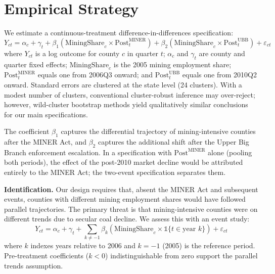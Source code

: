 \documentclass[12pt]{article}
\begin{document}



\section{Empirical Strategy}
\label{sec:design}

We estimate a continuous-treatment difference-in-differences specification:
\begin{equation}
\label{eq:main}
Y_{ct} = \alpha_c + \gamma_t + \beta_1 \left( \text{MiningShare}_c \times \text{Post}^{\text{MINER}}_t \right) + \beta_2 \left( \text{MiningShare}_c \times \text{Post}^{\text{UBB}}_t \right) + \varepsilon_{ct}
\end{equation}
where $Y_{ct}$ is a log outcome for county $c$ in quarter $t$; $\alpha_c$ and $\gamma_t$ are county and quarter fixed effects; $\text{MiningShare}_c$ is the 2005 mining employment share; $\text{Post}^{\text{MINER}}_t$ equals one from 2006Q3 onward; and $\text{Post}^{\text{UBB}}_t$ equals one from 2010Q2 onward. Standard errors are clustered at the state level (24 clusters). With a modest number of clusters, conventional cluster-robust inference may over-reject; however, wild-cluster bootstrap methods \citep{roth2023more} yield qualitatively similar conclusions for our main specifications.

The coefficient $\beta_1$ captures the differential trajectory of mining-intensive counties after the MINER Act, and $\beta_2$ captures the additional shift after the Upper Big Branch enforcement escalation. In a specification with $\text{Post}^{\text{MINER}}$ alone (pooling both periods), the effect of the post-2010 market decline would be attributed entirely to the MINER Act; the two-event specification separates them.

\textbf{Identification.} Our design requires that, absent the MINER Act and subsequent events, counties with different mining employment shares would have followed parallel trajectories. The primary threat is that mining-intensive counties were on different trends due to secular coal decline. We assess this with an event study:
\begin{equation}
\label{eq:es}
Y_{ct} = \alpha_c + \gamma_t + \sum_{k \neq -1} \beta_k \left( \text{MiningShare}_c \times \mathbb{1}\{t \in \text{year } k\} \right) + \varepsilon_{ct}
\end{equation}
where $k$ indexes years relative to 2006 and $k = -1$ (2005) is the reference period. Pre-treatment coefficients ($k < 0$) indistinguishable from zero support the parallel trends assumption.
\end{document}
